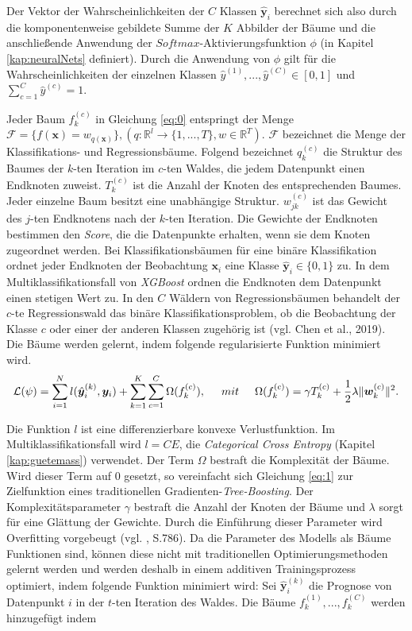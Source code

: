 \documentclass[a4paper,11pt]{article}
\begin{document}
Der Vektor der Wahrscheinlichkeiten der $C$ Klassen $\hat{\bm{y}}_i$ berechnet sich also durch die komponentenweise gebildete Summe der $K$ Abbilder der Bäume und die anschließende Anwendung der $Softmax$-Aktivierungsfunktion $\phi$ (in Kapitel \ref{kap:neuralNets} definiert). Durch die Anwendung von $\phi$ gilt für die Wahrscheinlichkeiten der einzelnen Klassen $\hat{y}^{(1)}, ..., \hat{y}^{(C)} \in [0,1]$ und $\sum_{c=1}^C \hat{y}^{(c)} = 1$.

Jeder Baum $f_k^{(c)}$ in Gleichung \ref{eq:0} entspringt der Menge $ \mathcal{F} = \{f(\bm{x}) = w_{q(\bm{x})} \}, (q: \mathbb{R}^l \xrightarrow{} \{1,...,T\}, w \in \mathbb{R}^T)$. $\mathcal{F}$ bezeichnet die Menge der Klassifikations- und Regressionsbäume. Folgend bezeichnet $q_k^{(c)}$ die Struktur des Baumes der $k$-ten Iteration im $c$-ten Waldes, die jedem Datenpunkt einen Endknoten zuweist. $T_k^{(c)}$ ist die Anzahl der Knoten des entsprechenden Baumes. Jeder einzelne Baum besitzt eine unabhängige Struktur. $w_{jk}^{(c)}$ ist das Gewicht des $j$-ten Endknotens nach der $k$-ten Iteration. Die Gewichte der Endknoten bestimmen den \textit{Score}, die die Datenpunkte erhalten, wenn sie dem Knoten zugeordnet werden. Bei Klassifikationsbäumen für eine binäre Klassifikation ordnet jeder Endknoten der Beobachtung $\bm{x}_i$ eine Klasse $\hat{\bm{y}}_i \in \{0,1\}$ zu. In dem Multiklassifikationsfall von \textit{XGBoost} ordnen die Endknoten dem Datenpunkt einen stetigen Wert zu. In den $C$ Wäldern von Regressionsbäumen behandelt der $c$-te Regressionswald das binäre Klassifikationsproblem, ob die Beobachtung der Klasse $c$ oder einer der anderen Klassen zugehörig ist (vgl. Chen et al., 2019).\\
Die Bäume werden gelernt, indem folgende regularisierte Funktion minimiert wird.
\begin{equation}\label{eq:1}
   \mathcal{L}(\psi) = \sum_{i=1}^N l(\hat{\bm{y}}_i^{(k)}, \bm{y}_i) + \sum_{k=1}^K \sum_{c=1}^C \Omega(f_k^{(c)}), \hspace{0.5cm} mit \hspace{0.5cm}
\Omega(f_k^{(c)}) = \gamma T_k^{(c)} + \frac{1}{2} \lambda \|\bm{w}_k^{(c)}\|^2 . 
\end{equation}


Die Funktion $l$ ist eine differenzierbare konvexe Verlustfunktion. Im Multiklassifikationsfall wird $l = CE$, die \textit{Categorical Cross Entropy} (Kapitel \ref{kap:guetemass}) verwendet. Der Term $\Omega$ bestraft die Komplexität der Bäume. Wird dieser Term auf $0$ gesetzt, so vereinfacht sich Gleichung \ref{eq:1} zur Zielfunktion eines traditionellen Gradienten-\textit{Tree-Boosting}. Der Komplexitätsparameter $\gamma$ bestraft die Anzahl der Knoten der Bäume und $\lambda$ sorgt für eine Glättung der Gewichte. Durch die Einführung dieser Parameter wird Overfitting vorgebeugt (vgl. \cite{XGBoost}, S.786).
Da die Parameter des Modells als Bäume Funktionen sind, können diese nicht mit traditionellen Optimierungsmethoden gelernt werden und werden deshalb in einem additiven Trainingsprozess optimiert, indem folgende Funktion minimiert wird:
Sei $\hat{\bm{y}}_i^{(k)}$ die Prognose von Datenpunkt $i$ in der $t$-ten Iteration des Waldes. Die Bäume $f_k^{(1)}, ..., f_k^{(C)}$ werden hinzugefügt indem 
\end{document}
